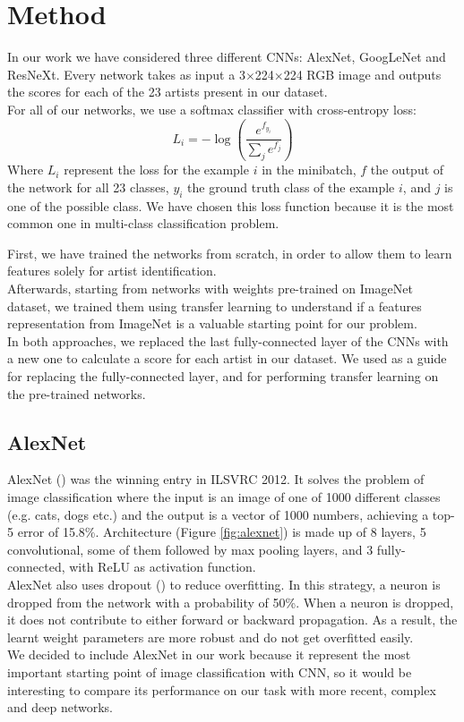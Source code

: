 \documentclass{article}
\begin{document}
\section{Method}\label{method}
In our work we have considered three different CNNs: AlexNet, GoogLeNet and ResNeXt. Every network takes as input a
3$\times$224$\times$224 RGB image and outputs the scores for each of the 23 artists present in our dataset.
\\
For all of our networks, we use a softmax classifier with
cross-entropy loss:
\begin{equation}
L_{i}=-\log \left(\frac{e^{f_{y_{i}}}}{\sum_{j} e^{f_{j}}}\right)
\end{equation}
Where $L_{i}$ represent the loss for the example $i$ in the minibatch, $f$ the output of the network for all 23 classes, $y_{i}$ the ground truth class of the example $i$, and $j$ is one of the possible class. 
We have chosen this loss function because it is the most common one in multi-class classification problem.

First, we have trained the networks from scratch, in order to allow them to learn features solely for artist identification. \\
Afterwards, starting from networks with weights pre-trained on ImageNet dataset, we trained them using transfer learning to understand if a features representation from ImageNet is a valuable starting point for our problem.\\
In both approaches, we replaced the last fully-connected layer of the CNNs with a new one to calculate a score for each artist in
our dataset. We used \cite{pytorchguide} as a guide for replacing the fully-connected layer, and for performing transfer learning on the pre-trained networks.

\subsection{AlexNet}
AlexNet (\cite{alexnet}) was the winning entry in ILSVRC 2012. It solves the problem of image classification where the input is an image of one of 1000 different classes (e.g. cats, dogs etc.) and the output is a vector of 1000 numbers, achieving a top-5 error of 15.8\%.
Architecture (Figure \ref{fig:alexnet}) is made up of 8 layers, 5 convolutional, some of them followed by max pooling layers, and 3 fully-connected, with ReLU as activation function.\\
AlexNet also uses dropout (\cite{dropout}) to reduce overfitting. In this strategy, a neuron is dropped from the network with a probability of 50\%. When a neuron is dropped, it does not contribute to either forward or backward propagation. 
As a result, the learnt weight parameters are more robust and do not get overfitted easily.\\
We decided to include AlexNet in our work because it represent the most important starting point of image classification with CNN, so it would be interesting to compare its performance on our task with more recent, complex and deep networks.
\end{document}
